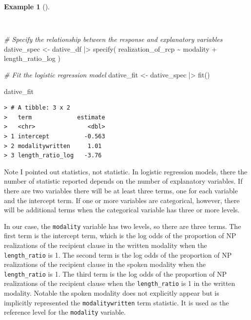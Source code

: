 \documentclass[
  letterpaper,
  DIV=11,
  numbers=noendperiod]{scrreprt}
\newenvironment{Shaded}{\begin{snugshade}}{\end{snugshade}}
\newcommand{\CommentTok}[1]{\textcolor[rgb]{0.00,0.00,0.00}{\textit{#1}}}
\newcommand{\FunctionTok}[1]{\textcolor[rgb]{0.00,0.00,0.00}{#1}}
\newcommand{\NormalTok}[1]{\textcolor[rgb]{0.00,0.00,0.00}{#1}}
\newcommand{\OtherTok}[1]{\textcolor[rgb]{0.00,0.00,0.00}{#1}}
\newcommand{\SpecialCharTok}[1]{\textcolor[rgb]{0.00,0.00,0.00}{#1}}
\theoremstyle{definition}
\newtheorem{example}{Example}[chapter]
\theoremstyle{remark}
\begin{document}
\begin{example}[]\protect\hypertarget{exm-ida-cat-logistic-regression}{}\label{exm-ida-cat-logistic-regression}

~

\begin{Shaded}
\begin{Highlighting}[]
\CommentTok{\# Specify the relationship between the response and explanatory variables}
\NormalTok{dative\_spec }\OtherTok{\textless{}{-}}
\NormalTok{  dative\_df }\SpecialCharTok{|\textgreater{}}
  \FunctionTok{specify}\NormalTok{(}
\NormalTok{    realization\_of\_rcp }\SpecialCharTok{\textasciitilde{}}\NormalTok{ modality }\SpecialCharTok{+}\NormalTok{ length\_ratio\_log}
\NormalTok{  )}

\CommentTok{\# Fit the logistic regression model}
\NormalTok{dative\_fit }\OtherTok{\textless{}{-}}
\NormalTok{  dative\_spec }\SpecialCharTok{|\textgreater{}}
  \FunctionTok{fit}\NormalTok{()}

\NormalTok{dative\_fit}
\end{Highlighting}
\end{Shaded}

\begin{verbatim}
> # A tibble: 3 x 2
>   term             estimate
>   <chr>               <dbl>
> 1 intercept          -0.563
> 2 modalitywritten     1.01 
> 3 length_ratio_log   -3.76
\end{verbatim}

\end{example}

Note I pointed out statistics, not statistic. In logistic regression
models, there the number of statistic reported depends on the number of
explanatory variables. If there are two variables there will be at least
three terms, one for each variable and the intercept term. If one or
more variables are categorical, however, there will be additional terms
when the categorical variable has three or more levels.

In our case, the \texttt{modality} variable has two levels, so there are
three terms. The first term is the intercept term, which is the log odds
of the proportion of NP realizations of the recipient clause in the
written modality when the \texttt{length\_ratio} is 1. The second term
is the log odds of the proportion of NP realizations of the recipient
clause in the spoken modality when the \texttt{length\_ratio} is 1. The
third term is the log odds of the proportion of NP realizations of the
recipient clause when the \texttt{length\_ratio} is 1 in the written
modality. Notable the spoken modality does not explicitly appear but is
implicitly represented the \texttt{modalitywritten} term statistic. It
is used as the reference level for the \texttt{modality} variable.
\end{document}
